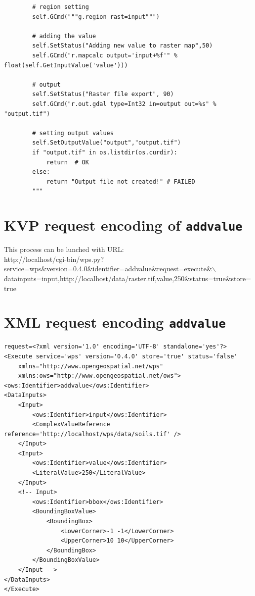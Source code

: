 \documentclass[a4paper,11pt]{article}
\begin{document}
\begin{verbatim}
        # region setting
        self.GCmd("""g.region rast=input""")    

        # adding the value
        self.SetStatus("Adding new value to raster map",50)
        self.GCmd("r.mapcalc output='input+%f'" % float(self.GetInputValue('value')))

        # output
        self.SetStatus("Raster file export", 90)
        self.GCmd("r.out.gdal type=Int32 in=output out=%s" % "output.tif")

        # setting output values
        self.SetOutputValue("output","output.tif")
        if "output.tif" in os.listdir(os.curdir):
            return  # OK
        else:
            return "Output file not created!" # FAILED
        """
    \end{verbatim}

\section{KVP request encoding of \texttt{addvalue}}
    This process can be lunched with URL:\\
    http://localhost/cgi-bin/wps.py?service=wps\&version=0.4.0\&identifier=addvalue\&request=execute\&$\backslash$\\
    datainputs=input,http://localhost/data/raster.tif,value,250\&status=true\&store=true

    \section{XML request encoding \texttt{addvalue}}
\begin{verbatim}
request=<?xml version='1.0' encoding='UTF-8' standalone='yes'?>
<Execute service='wps' version='0.4.0' store='true' status='false'
    xmlns="http://www.opengeospatial.net/wps"
    xmlns:ows="http://www.opengeospatial.net/ows">
<ows:Identifier>addvalue</ows:Identifier>
<DataInputs>
    <Input>
        <ows:Identifier>input</ows:Identifier>
        <ComplexValueReference reference='http://localhost/wps/data/soils.tif' />
    </Input>
    <Input>
        <ows:Identifier>value</ows:Identifier>
        <LiteralValue>250</LiteralValue>
    </Input>
    <!-- Input>
        <ows:Identifier>bbox</ows:Identifier>
        <BoundingBoxValue>
            <BoundingBox>
                <LowerCorner>-1 -1</LowerCorner>
                <UpperCorner>10 10</UpperCorner>
            </BoundingBox>
        </BoundingBoxValue>
    </Input -->
</DataInputs>
</Execute>
\end{verbatim}
\end{document}
